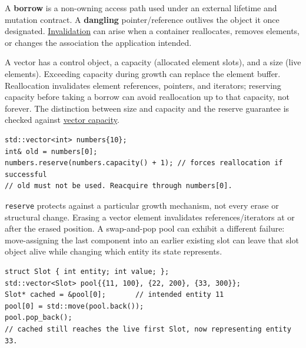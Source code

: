A \textbf{borrow} is a non-owning access path used under an external lifetime and mutation contract. A \textbf{dangling} pointer/reference outlives the object it once designated. \hyperref[appendix-f9b8b9188c7f]{Invalidation} can arise when a container reallocates, removes elements, or changes the association the application intended.

A vector has a control object, a capacity (allocated element slots), and a size (live elements). Exceeding capacity during growth can replace the element buffer. Reallocation invalidates element references, pointers, and iterators; reserving capacity before taking a borrow can avoid reallocation up to that capacity, not forever. The distinction between size and capacity and the reserve guarantee is checked against \href{https://eel.is/c++draft/vector.capacity}{vector capacity}.

\begin{verbatim}
std::vector<int> numbers{10};
int& old = numbers[0];
numbers.reserve(numbers.capacity() + 1); // forces reallocation if successful
// old must not be used. Reacquire through numbers[0].
\end{verbatim}

\texttt{reserve} protects against a particular growth mechanism, not every erase or structural change. Erasing a vector element invalidates references/iterators at or after the erased position. A swap-and-pop pool can exhibit a different failure: move-assigning the last component into an earlier existing slot can leave that slot object alive while changing which entity its state represents.

\begin{verbatim}
struct Slot { int entity; int value; };
std::vector<Slot> pool{{11, 100}, {22, 200}, {33, 300}};
Slot* cached = &pool[0];       // intended entity 11
pool[0] = std::move(pool.back());
pool.pop_back();
// cached still reaches the live first Slot, now representing entity 33.
\end{verbatim}

